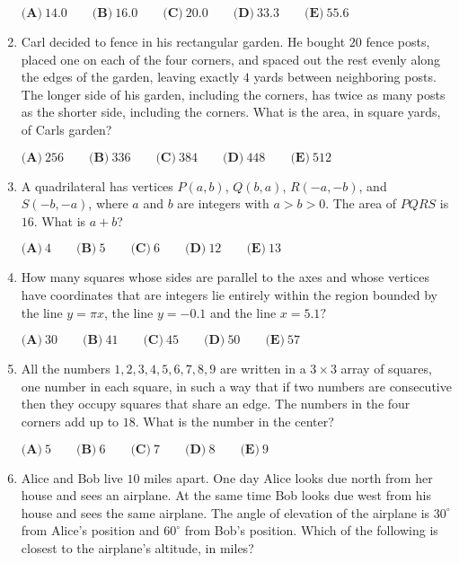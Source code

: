 \documentclass{article}
\begin{document}
\begin{enumerate}[label=\arabic*., itemsep=0.5em]
$\textbf{(A)}\ 14.0\qquad\textbf{(B)}\ 16.0\qquad\textbf{(C)}\ 20.0\qquad\textbf{(D)}\ 33.3\qquad\textbf{(E)}\ 55.6$\par \vspace{0.5em}\item Carl decided to fence in his rectangular garden. He bought $20$ fence posts, placed one on each of the four corners, and spaced out the rest evenly along the edges of the garden, leaving exactly $4$ yards between neighboring posts. The longer side of his garden, including the corners, has twice as many posts as the shorter side, including the corners. What is the area, in square yards, of Carls garden?

$\textbf{(A)}\ 256\qquad\textbf{(B)}\ 336\qquad\textbf{(C)}\ 384\qquad\textbf{(D)}\ 448\qquad\textbf{(E)}\ 512$\par \vspace{0.5em}\item A quadrilateral has vertices $P(a,b)$, $Q(b,a)$, $R(-a, -b)$, and $S(-b, -a)$, where $a$ and $b$ are integers with $a>b>0$. The area of $PQRS$ is $16$. What is $a+b$?

$\textbf{(A)}\ 4 \qquad\textbf{(B)}\ 5 \qquad\textbf{(C)}\ 6 \qquad\textbf{(D)}\ 12  \qquad\textbf{(E)}\ 13$\par \vspace{0.5em}\item How many squares whose sides are parallel to the axes and whose vertices have coordinates that are integers lie entirely within the region bounded by the line $y=\pi x$, the line $y=-0.1$ and the line $x=5.1?$

$\textbf{(A)}\ 30 \qquad
\textbf{(B)}\ 41 \qquad
\textbf{(C)}\ 45 \qquad
\textbf{(D)}\ 50 \qquad
\textbf{(E)}\ 57$\par \vspace{0.5em}\item All the numbers $1, 2, 3, 4, 5, 6, 7, 8, 9$ are written in a $3\times3$ array of squares, one number in each square, in such a way that if two numbers are consecutive then they occupy squares that share an edge. The numbers in the four corners add up to $18$. What is the number in the center?

$\textbf{(A)}\ 5\qquad\textbf{(B)}\ 6\qquad\textbf{(C)}\ 7\qquad\textbf{(D)}\ 8\qquad\textbf{(E)}\ 9$\par \vspace{0.5em}\item Alice and Bob live $10$ miles apart. One day Alice looks due north from her house and sees an airplane. At the same time Bob looks due west from his house and sees the same airplane. The angle of elevation of the airplane is $30^\circ$ from Alice's position and $60^\circ$ from Bob's position. Which of the following is closest to the airplane's altitude, in miles?


\end{enumerate}
\end{document}
